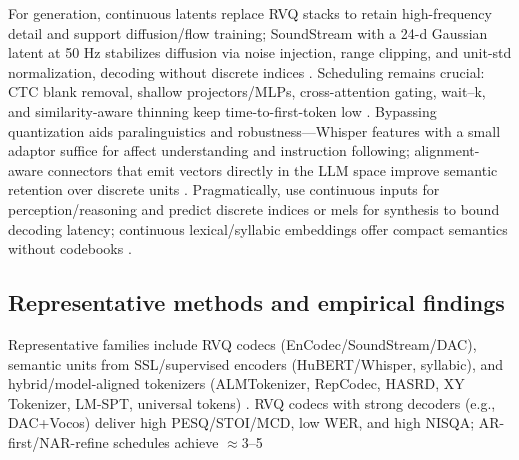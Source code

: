 \documentclass{article}
\begin{document}
For generation, continuous latents replace RVQ stacks to retain high-frequency detail and support diffusion/flow training; SoundStream with a 24-d Gaussian latent at 50 Hz stabilizes diffusion via noise injection, range clipping, and unit-std normalization, decoding without discrete indices \cite{yang2025diffsoundstreamefficientspeechtokenizati}. Scheduling remains crucial: CTC blank removal, shallow projectors/MLPs, cross-attention gating, wait--k, and similarity-aware thinning keep time-to-first-token low \cite{tsunoo2024decoderonlyarchitecturespeechrecognition,chen2024bestowefficientstreamablespeechlanguagem,xu2025optimaltransportregularizationspeechtext}. Bypassing quantization aids paralinguistics and robustness---Whisper features with a small adaptor suffice for affect understanding and instruction following; alignment-aware connectors that emit vectors directly in the LLM space improve semantic retention over discrete units \cite{wang2024blspemotowardsempatheticlargespeechlangu,tan2025ssralignmentawaremodalityconnectorspeech}. Pragmatically, use continuous inputs for perception/reasoning and predict discrete indices or mels for synthesis to bound decoding latency; continuous lexical/syllabic embeddings offer compact semantics without codebooks \cite{wang2024c3llmconditionalmultimodalcontentgenerat,yang2025diffsoundstreamefficientspeechtokenizati,tsunoo2024decoderonlyarchitecturespeechrecognition}.

\subsection{Representative methods and empirical findings} \label{subsec:representativemethodsandempiricalfindings}
Representative families include RVQ codecs (EnCodec/SoundStream/DAC), semantic units from SSL/supervised encoders (HuBERT/Whisper, syllabic), and hybrid/model-aligned tokenizers (ALMTokenizer, RepCodec, HASRD, XY Tokenizer, LM-SPT, universal tokens) \cite{fily2024establishingdegreesclosenessbetweenaudio,zhang2025impactframeratesspeechtokenizercasestudy,maimon2025salmonsuiteacousticlanguagemodelevaluati}. RVQ codecs with strong decoders (e.g., DAC+Vocos) deliver high PESQ/STOI/MCD, low WER, and high NISQA; AR-first/NAR-refine schedules achieve $\approx$3--5%
\end{document}
